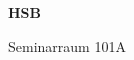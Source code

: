 \documentclass[a4paper]{article}
\begin{document}
\printGenericVSLHeader
\begin{center}
\begin{vsltext}{3cm}{4cm}

   \vspace{0.5cm} 

    \textbf{HSB} 

    \vspace{1.5cm}

    Seminarraum 101A

\end{vsltext}

\end{center}
\end{document}
